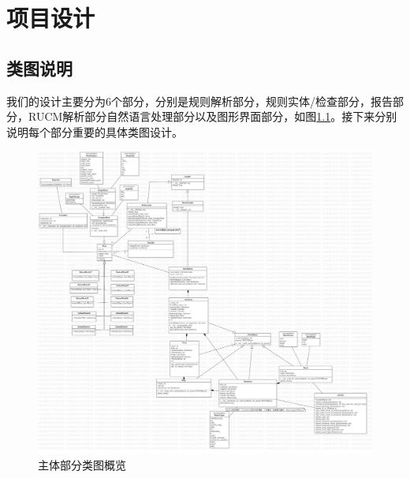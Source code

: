 \chapter{项目设计}

\section{类图说明}

	我们的设计主要分为6个部分，分别是规则解析部分，规则实体/检查部分，报告部分，RUCM解析部分自然语言处理部分以及图形界面部分，如图\ref{key}。接下来分别说明每个部分重要的具体类图设计。
		\begin{figure}
		\centering
		\includegraphics[width=1\textwidth]{src/classDiagram_overview.jpg} 
		\caption{主体部分类图概览} 
		\label{key}
	\end{figure}

